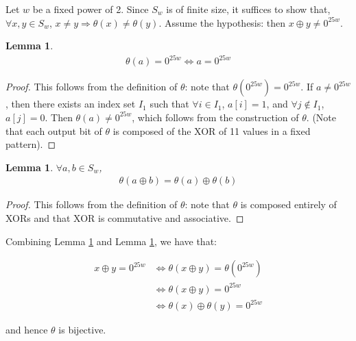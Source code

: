 \documentclass[10pt,twocolumn,twoside]{pnas-new}
\newtheorem{lemma}[theorem]{Lemma}
\begin{document}
Let $w$ be a fixed power of 2. Since $S_{w}$ is of finite size, it suffices to
show that, $\forall x, y \in S_{w}$,
$x \neq y \Rightarrow \theta(x) \neq \theta(y)$. Assume the hypothesis: then
$x \oplus y \neq 0^{25w}$.

\begin{lemma} \label{lem:p:t:1}
\begin{align*}
    \theta(a) = 0^{25w} \iff a = 0^{25w}
\end{align*}
\end{lemma}
\begin{proof}

This follows from the definition of $\theta$: note that
$\theta(0^{25w}) = 0^{25w}$. If $a \neq 0^{25w}$, then there
exists an index set $I_{1}$ such that $\forall i \in I_{1}$, $a[i] = 1$,
and $\forall j \not\in I_{1}$, $a[j] = 0$. Then $\theta(a) \neq 0^{25w}$,
which follows from the construction of $\theta$. (Note that each output
bit of $\theta$ is composed of the XOR of 11 values in a fixed pattern).

\end{proof}

\begin{lemma} \label{lem:p:t:2}
$\forall a, b \in S_{w}$,
\begin{align*}
    \theta(a \oplus b) = \theta(a) \oplus \theta(b)
\end{align*}
\end{lemma}
\begin{proof}

This follows from the definition of $\theta$: note that $\theta$ is
composed entirely of XORs and that XOR is commutative and associative.

\end{proof}


Combining Lemma \ref{lem:p:t:1} and Lemma \ref{lem:p:t:2}, we have that:

\begin{align*}
    x \oplus y = 0^{25w} & \iff \theta(x \oplus y) = \theta(0^{25w}) \\
        & \iff \theta(x \oplus y) = 0^{25w} \\
        & \iff \theta(x) \oplus \theta(y) = 0^{25w}
\end{align*}

and hence $\theta$ is bijective.
\end{document}
